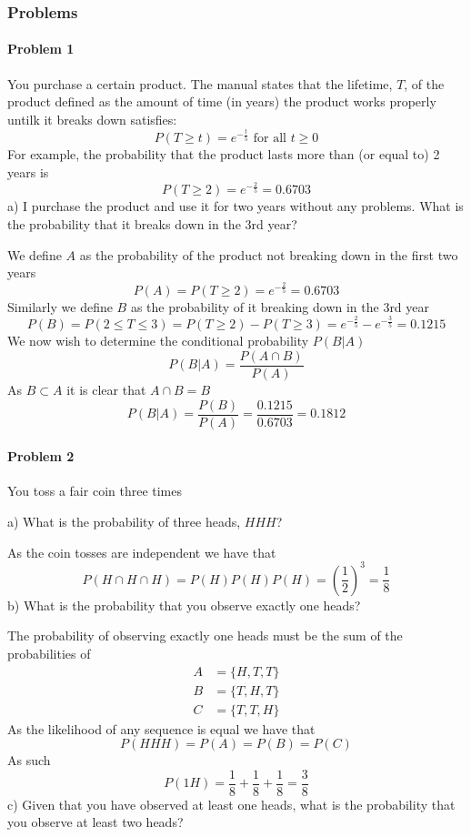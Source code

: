 \subsubsection{Problems}
\paragraph{Problem 1}
You purchase a certain product. The manual states that the lifetime, $T$, of the product defined as the amount of time (in years) the product works properly untilk it breaks down satisfies:
\[
    P(T\geq t)=e^{-\frac{t}{5}} \text{ for all } t\geq 0
\]
For example, the probability that the product lasts more than (or equal to) 2 years is
\[
    P(T\geq 2)=e^{-\frac{2}{5}}=0.6703
\]
a) I purchase the product and use it for two years without any problems. What is the probability that it breaks down in the 3rd year?

We define $A$ as the probability of the product not breaking down in the first two years
\[
    P(A)=P(T\geq 2)=e^{-\frac{2}{5}}=0.6703
\]
Similarly we define $B$ as the probability of it breaking down in the 3rd year
\[
    P(B)=P(2\leq T\leq 3)=P(T\geq 2)-P(T\geq 3)=e^{-\frac{2}{5}}-e^{-\frac{3}{5}}=0.1215
\]
We now wish to determine the conditional probability $P(B|A)$
\[
    P(B|A)=\frac{P(A\cap B)}{P(A)}
\]
As $B\subset A$ it is clear that $A\cap B=B$
\[
    P(B|A)=\frac{P(B)}{P(A)}=\frac{0.1215}{0.6703}=0.1812
\]
\paragraph{Problem 2}
You toss a fair coin three times

a) What is the probability of three heads, $HHH$?

As the coin tosses are independent we have that
\[
    P(H\cap H\cap H)=P(H)P(H)P(H)=\left(\frac{1}{2}\right)^{3}=\frac{1}{8}
\]
b) What is the probability that you observe exactly one heads?

The probability of observing exactly one heads must be the sum of the probabilities of
\begin{align*}
    A&=\{H,T,T\} \\
    B&=\{T,H,T\} \\
    C&=\{T,T,H\}
\end{align*}
As the likelihood of any sequence is equal we have that
\[
    P(HHH)=P(A)=P(B)=P(C)
\]
As such
\[
    P(1H)=\frac{1}{8}+\frac{1}{8}+\frac{1}{8}=\frac{3}{8}
\]
c) Given that you have observed at least one heads, what is the probability that you observe at least two heads?

